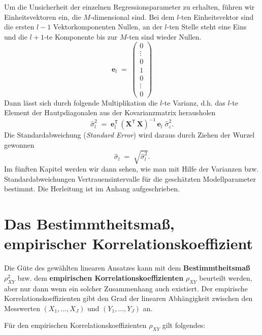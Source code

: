 Um die Unsicherheit der einzelnen Regressionsparameter zu erhalten, führen wir Einheitsvektoren ein, die $M$-dimensional sind.
Bei dem $l$-ten Einheitsvektor sind die ersten $l-1$ Vektorkomponenten Nullen, an der $l$-ten Stelle steht eine Eins
und die $l+1$-te Komponente bis zur $M$-ten sind wieder Nullen.
\begin{equation}
\boldsymbol{e}_l \; = \;
\left(\begin{array}{c}
0\\
\vdots\\
0\\
1\\
0\\
\vdots\\
0
\end{array}\right)
\end{equation}
Dann lässt sich durch folgende Multiplikation die $l$-te Varianz, d.h. das $l$-te Element
der Hautpdiagonalen aus der Kovarianzmatrix herausholen
\begin{equation}
\hat \sigma_l^2 \; = \; \boldsymbol{e}_l^\mathsf{T} \, \left( \mathbf{X}^\mathsf{T}  \, \mathbf{X} \right)^{-1} \, \boldsymbol{e}_l  \; \hat \sigma_{\varepsilon}^2 .
\label{eq:URegressparamsMatrix}
\end{equation}
Die Standardabweichung (\textsl{Standard Error}) wird daraus durch Ziehen der Wurzel
gewonnen
\begin{equation}
\hat \sigma_l \; = \; \sqrt{\hat \sigma_l^2} .
\end{equation}
Im fünften Kapitel werden wir dann sehen, wie man mit Hilfe der Varianzen bzw. Standardabweichungen Vertrauensintervalle für die geschätzten Modellparameter bestimmt.
Die Herleitung ist im Anhang aufgeschrieben.

\newpage
\section{Das Bestimmtheitsmaß, empirischer Korrelationskoeffizient}
Die G\"{u}te des gew\"{a}hlten linearen Ansatzes kann mit dem
\textbf{Bestimmtheitsmaß} $\rho_{XY}^2 $ bzw. dem \textbf{empirischen
	Korrelationskoeffizienten} $\rho_{XY}$ beurteilt werden, aber nur dann
wenn ein solcher Zusammenhang auch existiert. Der empirische
Korrelationskoeffizienten gibt den Grad der linearen
Abh\"{a}ngigkeit zwischen den Messwerten $(X_1 ,\ldots ,X_J )$ und
$(Y_1 ,\ldots ,Y_J)$ an.

Für den empirischen Korrelationskoeffizienten $\rho_{XY}$ gilt folgendes:


